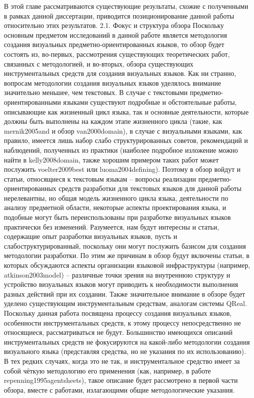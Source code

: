 	В этой главе рассматриваются существующие результаты, схожие с полученными в рамках данной диссертации, приводится позиционирование данной работы относительно этих результатов.
2.1. Фокус и структура обзора
	Поскольку основным предметом исследований в данной работе является методология создания визуальных предметно-ориентированных языков, то обзор будет состоять из, во-первых, рассмотрения существующих теоретических работ, связанных с методологией, и во-вторых, обзора существующих инструментальных средств для создания визуальных языков.
	Как ни странно, вопросам методологии создания визуальных языков уделялось внимание значительно меньшее, чем текстовых. В случае с текстовыми предметно-ориентированными языками существуют подробные и обстоятельные работы, описывающие как жизненный цикл языка, так и основные деятельности, которые должны быть выполнены на каждом этапе жизненного цикла (такие, как mernik2005and и обзор van2000domain), в случае с визуальными языками, как правило, имеется лишь набор слабо структурированных советов, рекомендаций и наблюдений, полученных из практики (наиболее подробное изложение можно найти в kelly2008domain, также хорошим примером таких работ может послужить voelter2009best или luoma2004defining). Поэтому в обзор войдут и статьи, относящиеся к текстовым языкам – вопросы реализации предметно-ориентированных средств разработки для текстовых языков для данной работы нерелевантны, но общая модель жизненного цикла языка, деятельности по анализу предметной области, некоторые аспекты проектирования языка, и подобные могут быть переиспользованы при разработке визуальных языков практически без изменений. Разумеется, нам будут интересны и статьи, содержащие опыт разработки визуальных языков, пусть и слабоструктурированный, поскольку они могут послужить базисом для создания методологии разработки. По этим же причинам в обзор будут включены статьи, в которых обсуждаются аспекты организации языковой инфраструктуры (например, atkinson2003model) – различные точки зрения на внутреннюю структуру и устройство визуальных языков могут приводить к необходимости выполнения разных действий при их создании.
	Также значительное внимание в обзоре будет уделено существующим инструментальным средствам, аналогам системы QReal. Поскольку данная работа посвящена процессу создания визуальных языков, особенности инструментальных средств, к этому процессу непосредственно не относящиеся, рассматриваться не будут. Большинство имеющихся описаний инструментальных средств не фокусируются на какой-либо методологии создания визуального языка (представляя средства, но не указания по их использованию). В тех редких случаях, когда это не так, и инструментальное средство имеет за собой чёткую методологию его применения (как, например, в работе repenning1995agentsheets), такое описание будет рассмотрено в первой части обзора, вместе с работами, излагающими общие методологические указания.
